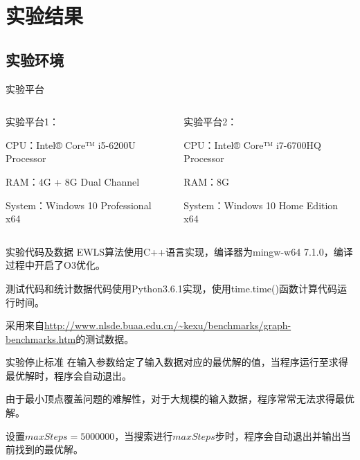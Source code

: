 \documentclass[9pt,dvipsnames,table,UTF8,aspectratio=169]{beamer}
\begin{document}
\section{实验结果}
\subsection{实验环境}
\begin{frame}{实验平台}
	\begin{columns}
		\begin{column}{0.5\textwidth}
			实验平台1：
			
			CPU：Intel® Core™ i5-6200U Processor

			RAM：4G + 8G Dual Channel

			System：Windows 10 Professional x64
		\end{column}
		\begin{column}{0.5\textwidth}
			实验平台2：

			CPU：Intel® Core™ i7-6700HQ Processor

			RAM：8G

			System：Windows 10 Home Edition x64
		\end{column}
	\end{columns}
\end{frame}

\begin{frame}{实验代码及数据}
	EWLS算法使用C++语言实现，编译器为mingw-w64 7.1.0，编译过程中开启了O3优化。

	测试代码和统计数据代码使用Python3.6.1实现，使用time.time()函数计算代码运行时间\footnotemark。

	采用来自\url{http://www.nlsde.buaa.edu.cn/~kexu/benchmarks/graph-benchmarks.htm}的测试数据。

\end{frame}

\begin{frame}{实验停止标准}
	在输入参数给定了输入数据对应的最优解的值，当程序运行至求得最优解时，程序会自动退出。

	由于最小顶点覆盖问题的难解性，对于大规模的输入数据，程序常常无法求得最优解。

	设置$maxSteps = 5000000$，当搜索进行$maxSteps$步时，程序会自动退出并输出当前找到的最优解。
\end{frame}
\end{document}
